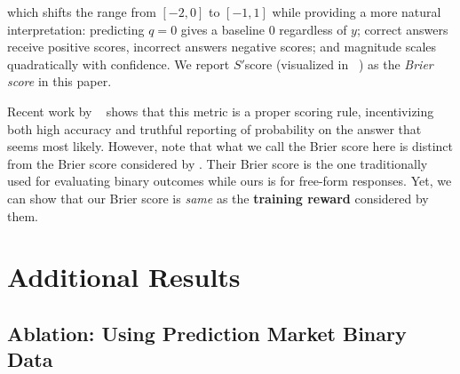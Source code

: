 \documentclass{article} %
\begin{document}
which shifts the range from $[-2,0]$ to $[-1,1]$ while providing a more natural interpretation: predicting $q=0$ gives a baseline $0$ regardless of $y$; correct answers receive positive scores, incorrect answers negative scores; and magnitude scales quadratically with confidence. We report $S'$score (visualized in ~) as the \emph{Brier score} in this paper. 

Recent work by ~\citet{damani2025beyond} shows that this metric is a proper scoring rule, incentivizing both high accuracy and truthful reporting of probability on the answer that seems most likely. However, note that what we call the Brier score here is distinct from the Brier score considered by \citet{damani2025beyond}. Their Brier score is the one traditionally used for evaluating binary outcomes while ours is for free-form responses. Yet, we can show that our Brier score is \textit{same} as the \textbf{training reward} considered by them.
\clearpage





\section{Additional Results}
\label{sec:extra_results}

\subsection{Ablation: Using Prediction Market Binary Data}
\label{sec:binary_ablations}
\end{document}
